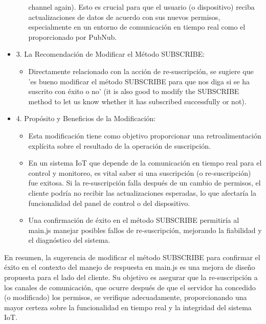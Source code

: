 \documentclass{report}
\begin{document}
\begin{itemize}
\begin{itemize}
            channel again). Esto es crucial para que el usuario (o dispositivo) reciba actualizaciones de datos de acuerdo con sus nuevos permisos, 
            especialmente en un entorno de comunicación en tiempo real como el proporcionado por PubNub.
        \end{itemize}
    \item 3. La Recomendación de Modificar el Método SUBSCRIBE:
        \begin{itemize}
            \item Directamente relacionado con la acción de re-suscripción, se sugiere que 'es bueno modificar el método SUBSCRIBE para 
            que nos diga si se ha suscrito con éxito o no' (it is also good to modify the SUBSCRIBE method to let us know whether it has subscribed 
            successfully or not).
        \end{itemize}
    \item 4. Propósito y Beneficios de la Modificación:
        \begin{itemize}
            \item Esta modificación tiene como objetivo proporcionar una retroalimentación explícita sobre el resultado de la operación de suscripción.
            \item En un sistema IoT que depende de la comunicación en tiempo real para el control y monitoreo, es vital saber si una suscripción 
            (o re-suscripción) fue exitosa. Si la re-suscripción falla después de un cambio de permisos, el cliente podría no recibir las actualizaciones 
            esperadas, lo que afectaría la funcionalidad del panel de control o del dispositivo.
            \item Una confirmación de éxito en el método SUBSCRIBE permitiría al main.js manejar posibles fallos de re-suscripción, mejorando la 
            fiabilidad y el diagnóstico del sistema.
        \end{itemize}
\end{itemize}
En resumen, la sugerencia de modificar el método SUBSCRIBE para confirmar el éxito en el contexto del manejo de respuesta en main.js es 
una mejora de diseño propuesta para el lado del cliente. Su objetivo es asegurar que la re-suscripción a los canales de comunicación, que 
ocurre después de que el servidor ha concedido (o modificado) los permisos, se verifique adecuadamente, proporcionando una mayor certeza 
sobre la funcionalidad en tiempo real y la integridad del sistema IoT.
\end{document}
